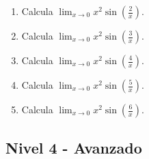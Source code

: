 \documentclass[11pt,a4paper]{article}
\begin{document}
\begin{enumerate}[label=\textbf{E\arabic*.},start=641]
\item Calcula $\displaystyle\lim_{x\to0}x^2\sin\left(\frac{2}{x}\right)$.

\item Calcula $\displaystyle\lim_{x\to0}x^2\sin\left(\frac{3}{x}\right)$.

\item Calcula $\displaystyle\lim_{x\to0}x^2\sin\left(\frac{4}{x}\right)$.

\item Calcula $\displaystyle\lim_{x\to0}x^2\sin\left(\frac{5}{x}\right)$.

\item Calcula $\displaystyle\lim_{x\to0}x^2\sin\left(\frac{6}{x}\right)$.

\end{enumerate}

\subsection{Nivel 4 - Avanzado}
\end{document}
